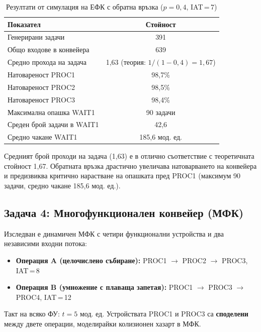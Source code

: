 \begin{table}[H]
    \centering
    \caption{Резултати от симулация на ЕФК с обратна връзка ($p = 0{,}4$, IAT\,=\,7)}
    \begin{tabular}{|l|c|}
        \hline
        \textbf{Показател} & \textbf{Стойност} \\
        \hline
        Генерирани задачи & 391 \\
        \hline
        Общо входове в конвейера & 639 \\
        \hline
        Средно прохода на задача & 1{,}63 \quad (теория: $1/(1-0{,}4) = 1{,}67$) \\
        \hline
        Натовареност PROC1 & 98{,}7\% \\
        \hline
        Натовареност PROC2 & 98{,}5\% \\
        \hline
        Натовареност PROC3 & 98{,}4\% \\
        \hline
        Максимална опашка WAIT1 & 90 задачи \\
        \hline
        Среден брой задачи в WAIT1 & 42{,}6 \\
        \hline
        Средно чакане WAIT1 & 185{,}6 мод. ед. \\
        \hline
    \end{tabular}
\end{table}

Средният брой проходи на задача (1{,}63) е в отлично съответствие с теоретичната стойност 1{,}67. Обратната връзка драстично увеличава натоварването на конвейера и предизвиква критично нарастване на опашката пред PROC1 (максимум 90 задачи, средно чакане 185{,}6 мод. ед.).

\subsection{Задача 4: Многофункционален конвейер (МФК)}

Изследван е динамичен МФК с четири функционални устройства и два независими входни потока:
\begin{itemize}
    \item \textbf{Операция A (целочислено събиране):} PROC1 $\to$ PROC2 $\to$ PROC3, IAT\,=\,8
    \item \textbf{Операция B (умножение с плаваща запетая):} PROC1 $\to$ PROC3 $\to$ PROC4, IAT\,=\,12
\end{itemize}

Такт на всяко ФУ: $t = 5$ мод. ед. Устройствата PROC1 и PROC3 са \textbf{споделени} между двете операции, моделирайки колизионен хазарт в МФК.

